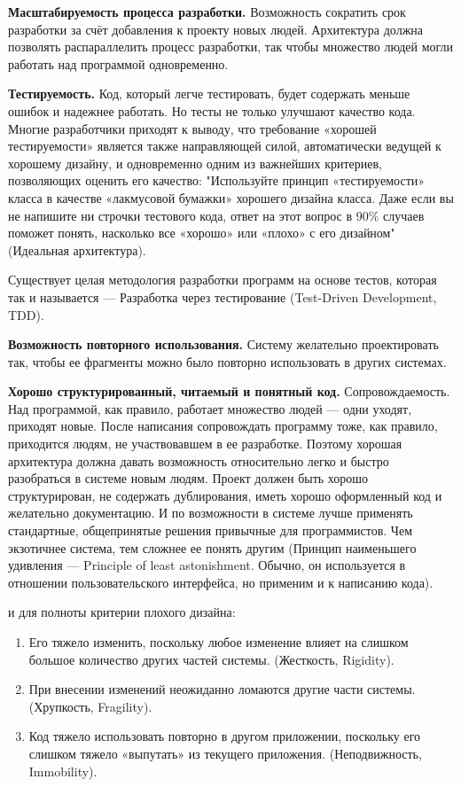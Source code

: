 \documentclass[a4paper]{article}
\begin{document}
\noindent\textbf{Масштабируемость процесса разработки.} Возможность сократить срок разработки за счёт добавления к проекту новых людей. Архитектура должна позволять распараллелить процесс разработки, так чтобы множество людей могли работать над программой одновременно.

\noindent\textbf{Тестируемость.} Код, который легче тестировать, будет содержать меньше ошибок и надежнее работать. Но тесты не только улучшают качество кода. Многие разработчики приходят к выводу, что требование «хорошей тестируемости» является также направляющей силой, автоматически ведущей к хорошему дизайну, и одновременно одним из важнейших критериев, позволяющих оценить его качество: "Используйте принцип «тестируемости» класса в качестве «лакмусовой бумажки» хорошего дизайна класса. Даже если вы не напишите ни строчки тестового кода, ответ на этот вопрос в 90\% случаев поможет понять, насколько все «хорошо» или «плохо» с его дизайном" (Идеальная архитектура).

Существует целая методология разработки программ на основе тестов, которая так и называется — Разработка через тестирование (Test-Driven Development, TDD).

\noindent\textbf{Возможность повторного использования.} Систему желательно проектировать так, чтобы ее фрагменты можно было повторно использовать в других системах.

\noindent\textbf{Хорошо структурированный, читаемый и понятный код.} Сопровождаемость. Над программой, как правило, работает множество людей — одни уходят, приходят новые. После написания сопровождать программу тоже, как правило, приходится людям, не участвовавшем в ее разработке. Поэтому хорошая архитектура должна давать возможность относительно легко и быстро разобраться в системе новым людям. Проект должен быть хорошо структурирован, не содержать дублирования, иметь хорошо оформленный код и желательно документацию. И по возможности в системе лучше применять стандартные, общепринятые решения привычные для программистов. Чем экзотичнее система, тем сложнее ее понять другим (Принцип наименьшего удивления — Principle of least astonishment. Обычно, он используется в отношении пользовательского интерфейса, но применим и к написанию кода).

 и для полноты критерии плохого дизайна:
\begin{enumerate}
\item Его тяжело изменить, поскольку любое изменение влияет на слишком большое количество других частей системы. (Жесткость, Rigidity).
\item При внесении изменений неожиданно ломаются другие части системы. (Хрупкость, Fragility).
\item Код тяжело использовать повторно в другом приложении, поскольку его слишком тяжело «выпутать» из текущего приложения. (Неподвижность, Immobility).
\end{enumerate}
\end{document}
